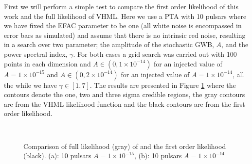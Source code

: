 \documentclass[iop]{emulateapj}
\begin{document}
First we will perform a simple test to compare the first order likelihood of this work and the full likelihood of VHML. Here we use a PTA with 10 pulsars where we have fixed the EFAC parameter to be one (all white noise is encompassed in error bars as simulated) and assume that there is no intrinsic red noise, resulting in a search over two parameter; the amplitude of the stochastic GWB, $A$, and the power spectral index, $\gamma$. For both cases a grid search was carried out with 100 points in each dimension and $A\in (0,1\times 10^{-14})$ for an injected value of $A=1\times 10^{-15}$ and $A\in (0,2\times 10^{-14})$ for an injected value of $A=1\times 10^{-14}$, all the while we have $\gamma \in [1,7]$. The results are presented in Figure \ref{fig:compare} where the contours denote the one, two and three sigma credible regions, the gray contours are from the VHML likelihood function and the black contours are from the first order likelihood.
\begin{figure}[t]
  \begin{center}
  \\
   \end{center}
  \caption{Comparison of full likelihood (gray) of \citet{hlm+09} and the first order likelihood (black). (a): 10 pulsars $A=1\times 10^{-15}$, (b): 10 pulsars $A=1\times 10^{-14}$ }
\label{fig:compare}
\end{figure}
\end{document}
